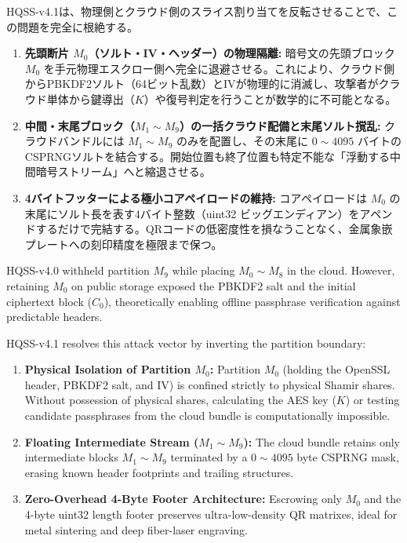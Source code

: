 \documentclass[11pt,a4paper,titlepage]{article}
\begin{document}
HQSS-v4.1は、物理側とクラウド側のスライス割り当てを反転させることで、この問題を完全に根絶する。
\begin{enumerate}
  \item \textbf{先頭断片 $M_0$（ソルト・IV・ヘッダー）の物理隔離:}
    暗号文の先頭ブロック $M_0$ を手元物理エスクロー側へ完全に退避させる。これにより、クラウド側からPBKDF2ソルト（64ビット乱数）とIVが物理的に消滅し、攻撃者がクラウド単体から鍵導出（$K$）や復号判定を行うことが数学的に不可能となる。
  \item \textbf{中間・末尾ブロック（$M_1 \sim M_9$）の一括クラウド配備と末尾ソルト撹乱:}
    クラウドバンドルには $M_1 \sim M_9$ のみを配置し、その末尾に $0 \sim 4095$ バイトのCSPRNGソルトを結合する。開始位置も終了位置も特定不能な「浮動する中間暗号ストリーム」へと縮退させる。
  \item \textbf{4バイトフッターによる極小コアペイロードの維持:}
    コアペイロードは $M_0$ の末尾にソルト長を表す4バイト整数（uint32 ビッグエンディアン）をアペンドするだけで完結する。QRコードの低密度性を損なうことなく、金属象嵌プレートへの刻印精度を極限まで保つ。
\end{enumerate}
\else
HQSS-v4.0 withheld partition $M_9$ while placing $M_0 \sim M_8$ in the cloud. However, retaining $M_0$ on public storage exposed the PBKDF2 salt and the initial ciphertext block ($C_0$), theoretically enabling offline passphrase verification against predictable headers.

HQSS-v4.1 resolves this attack vector by inverting the partition boundary:
\begin{enumerate}
  \item \textbf{Physical Isolation of Partition $M_0$:} Partition $M_0$ (holding the OpenSSL header, PBKDF2 salt, and IV) is confined strictly to physical Shamir shares. Without possession of physical shares, calculating the AES key ($K$) or testing candidate passphrases from the cloud bundle is computationally impossible.
  \item \textbf{Floating Intermediate Stream ($M_1 \sim M_9$):} The cloud bundle retains only intermediate blocks $M_1 \sim M_9$ terminated by a $0 \sim 4095$ byte CSPRNG mask, erasing known header footprints and trailing structures.
  \item \textbf{Zero-Overhead 4-Byte Footer Architecture:} Escrowing only $M_0$ and the 4-byte uint32 length footer preserves ultra-low-density QR matrixes, ideal for metal sintering and deep fiber-laser engraving.
\end{enumerate}
\fi
\end{document}
